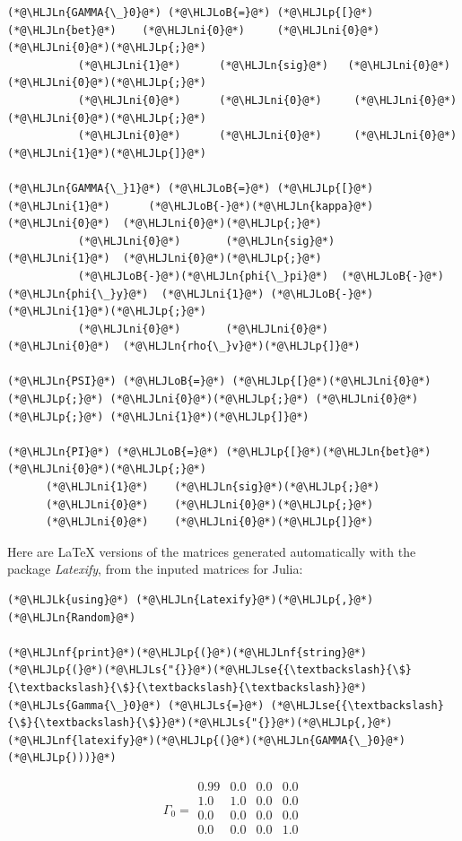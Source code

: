 \documentclass[12pt,a4paper]{article}
\newcommand{\HLJLk}[1]{\textcolor[RGB]{148,91,176}{\textbf{#1}}}
\newcommand{\HLJLn}[1]{#1}
\newcommand{\HLJLnf}[1]{\textcolor[RGB]{66,102,213}{#1}}
\newcommand{\HLJLs}[1]{\textcolor[RGB]{201,61,57}{#1}}
\newcommand{\HLJLse}[1]{\textcolor[RGB]{59,151,46}{#1}}
\newcommand{\HLJLni}[1]{\textcolor[RGB]{59,151,46}{#1}}
\newcommand{\HLJLoB}[1]{\textcolor[RGB]{102,102,102}{\textbf{#1}}}
\newcommand{\HLJLp}[1]{#1}
\begin{document}
\begin{lstlisting}
(*@\HLJLn{GAMMA{\_}0}@*) (*@\HLJLoB{=}@*) (*@\HLJLp{[}@*)(*@\HLJLn{bet}@*)    (*@\HLJLni{0}@*)     (*@\HLJLni{0}@*)  (*@\HLJLni{0}@*)(*@\HLJLp{;}@*)
           (*@\HLJLni{1}@*)      (*@\HLJLn{sig}@*)   (*@\HLJLni{0}@*)  (*@\HLJLni{0}@*)(*@\HLJLp{;}@*)
           (*@\HLJLni{0}@*)      (*@\HLJLni{0}@*)     (*@\HLJLni{0}@*)  (*@\HLJLni{0}@*)(*@\HLJLp{;}@*)
           (*@\HLJLni{0}@*)      (*@\HLJLni{0}@*)     (*@\HLJLni{0}@*)  (*@\HLJLni{1}@*)(*@\HLJLp{]}@*)

(*@\HLJLn{GAMMA{\_}1}@*) (*@\HLJLoB{=}@*) (*@\HLJLp{[}@*)(*@\HLJLni{1}@*)      (*@\HLJLoB{-}@*)(*@\HLJLn{kappa}@*)  (*@\HLJLni{0}@*)  (*@\HLJLni{0}@*)(*@\HLJLp{;}@*)
           (*@\HLJLni{0}@*)       (*@\HLJLn{sig}@*)    (*@\HLJLni{1}@*)  (*@\HLJLni{0}@*)(*@\HLJLp{;}@*)
           (*@\HLJLoB{-}@*)(*@\HLJLn{phi{\_}pi}@*)  (*@\HLJLoB{-}@*)(*@\HLJLn{phi{\_}y}@*)  (*@\HLJLni{1}@*) (*@\HLJLoB{-}@*)(*@\HLJLni{1}@*)(*@\HLJLp{;}@*)
           (*@\HLJLni{0}@*)       (*@\HLJLni{0}@*)      (*@\HLJLni{0}@*)  (*@\HLJLn{rho{\_}v}@*)(*@\HLJLp{]}@*)

(*@\HLJLn{PSI}@*) (*@\HLJLoB{=}@*) (*@\HLJLp{[}@*)(*@\HLJLni{0}@*)(*@\HLJLp{;}@*) (*@\HLJLni{0}@*)(*@\HLJLp{;}@*) (*@\HLJLni{0}@*)(*@\HLJLp{;}@*) (*@\HLJLni{1}@*)(*@\HLJLp{]}@*)

(*@\HLJLn{PI}@*) (*@\HLJLoB{=}@*) (*@\HLJLp{[}@*)(*@\HLJLn{bet}@*)  (*@\HLJLni{0}@*)(*@\HLJLp{;}@*)
      (*@\HLJLni{1}@*)    (*@\HLJLn{sig}@*)(*@\HLJLp{;}@*)
      (*@\HLJLni{0}@*)    (*@\HLJLni{0}@*)(*@\HLJLp{;}@*)
      (*@\HLJLni{0}@*)    (*@\HLJLni{0}@*)(*@\HLJLp{]}@*)
\end{lstlisting}


Here are LaTeX versions of the matrices generated automatically with the package \emph{Latexify}, from the inputed matrices for Julia:


\begin{lstlisting}
(*@\HLJLk{using}@*) (*@\HLJLn{Latexify}@*)(*@\HLJLp{,}@*) (*@\HLJLn{Random}@*)

(*@\HLJLnf{print}@*)(*@\HLJLp{(}@*)(*@\HLJLnf{string}@*)(*@\HLJLp{(}@*)(*@\HLJLs{"{}}@*)(*@\HLJLse{{\textbackslash}{\$}{\textbackslash}{\$}{\textbackslash}{\textbackslash}}@*)(*@\HLJLs{Gamma{\_}0}@*) (*@\HLJLs{=}@*) (*@\HLJLse{{\textbackslash}{\$}{\textbackslash}{\$}}@*)(*@\HLJLs{"{}}@*)(*@\HLJLp{,}@*)(*@\HLJLnf{latexify}@*)(*@\HLJLp{(}@*)(*@\HLJLn{GAMMA{\_}0}@*)(*@\HLJLp{)))}@*)
\end{lstlisting}

\begin{equation}
\Gamma_0 =
\begin{array}{cccc}
0.99 & 0.0 & 0.0 & 0.0 \\
1.0 & 1.0 & 0.0 & 0.0 \\
0.0 & 0.0 & 0.0 & 0.0 \\
0.0 & 0.0 & 0.0 & 1.0 \\
\end{array}
\end{equation}
\end{document}
